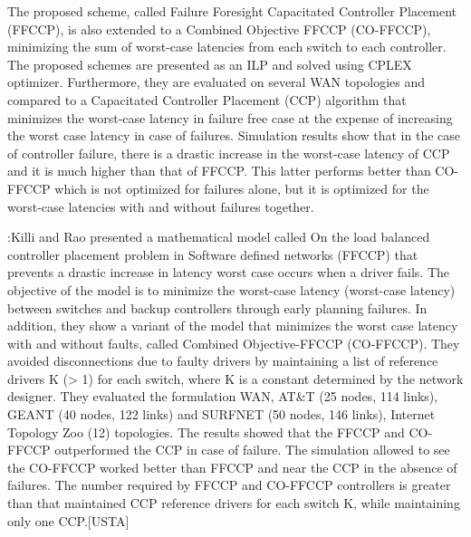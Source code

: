 \documentclass[a4paper,10pt]{article}
\begin{document}
The proposed scheme, called Failure Foresight Capacitated Controller Placement (FFCCP), is also extended to a Combined Objective FFCCP (CO-FFCCP), minimizing the sum of worst-case latencies from each switch to each controller. The proposed schemes are presented as an ILP and solved using CPLEX optimizer. Furthermore, they are evaluated on several WAN topologies and compared to a Capacitated Controller Placement (CCP) algorithm that minimizes the worst-case latency in failure free case at the expense of increasing the worst case latency in case of failures. Simulation results show that in the case of controller failure,  there is a drastic increase in the worst-case latency of CCP and it is much higher than that of FFCCP. This latter performs better than CO-FFCCP which is not optimized for failures alone, but it is optimized for the worst-case latencies with and without failures together. 


\cite{KiRa16}:Killi and Rao presented a mathematical model called On the load balanced controller placement problem in Software defined networks (FFCCP) that prevents a drastic increase in latency worst case occurs when a driver fails. The objective of the model is to minimize the worst-case latency (worst-case latency) between switches and backup controllers through early planning failures. In addition, they show a variant of the model that minimizes the worst case latency with and without faults, called Combined Objective-FFCCP (CO-FFCCP). They avoided disconnections due to faulty drivers by maintaining a list of reference drivers K (> 1) for each switch, where K is a constant determined by the network designer.
They evaluated the formulation WAN, AT&T (25 nodes, 114 links), GEANT (40 nodes, 122 links) and SURFNET (50 nodes, 146 links), Internet Topology Zoo (12) topologies. The results showed that the FFCCP and CO-FFCCP outperformed the CCP in case of failure. The simulation allowed to see the CO-FFCCP worked better than FFCCP and near the CCP in the absence of failures. The number required by FFCCP and CO-FFCCP controllers is greater than that maintained CCP reference drivers for each switch K, while maintaining only one CCP.[USTA]
\end{document}
